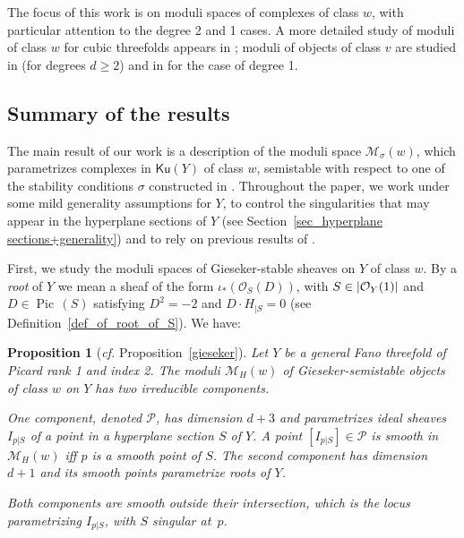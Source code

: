 \documentclass[11pt]{amsart}
\newtheorem{proposition}[thm]{Proposition}
\theoremstyle{definition}
\DeclareMathOperator{\Pic}{Pic\,}
\newcommand{\sO}{\mathcal{O}}
\newcommand{\sM}{\mathcal{M}}
\DeclarePairedDelimiter{\abs}{\lvert}{\rvert}
\newcommand{\Ku}{\mathsf{Ku}}
\begin{document}
The focus of this work is on moduli spaces of complexes of class $w$, with particular attention to the degree 2 and 1 cases.
A more detailed study of moduli of class $w$ for cubic threefolds appears in \cite{Bayer}; moduli of objects of class $v$ are studied in \cite{PY20} (for degrees $d\geq 2$) and in \cite{PR20_veronese} for the case of degree 1.

\subsection*{Summary of the results}

The main result of our work is a description of the moduli space $\sM_\sigma(w)$, which parametrizes complexes in $\Ku(Y)$ of class $w$, semistable with respect to one of the stability conditions $\sigma$ constructed in \cite{BLMS17}. Throughout the paper, we work under some mild generality assumptions for $Y$, to control the singularities that may appear in the hyperplane sections of $Y$ (see Section~\ref{sec_hyperplane sections+generality}) and to rely on previous results of \cite{Wel81,Tih82}.


First, we study the moduli spaces of Gieseker-stable sheaves on $Y$ of class $w$. By a \emph{root} of $Y$ we mean a sheaf of the form  $\iota_*(\sO_S(D))$, with $S\in \abs{\sO_Y(1)}$ and $D\in \Pic(S)$ satisfying $D^2=-2$ and $D\cdot H_{|S}=0$ (see Definition~\ref{def_of_root_of_S}). We have:

\begin{proposition}[\emph{cf.} Proposition~\ref{gieseker}]
Let $Y$ be a general Fano threefold of Picard rank 1 and index 2. The moduli $\sM_H(w)$ of Gieseker-semistable objects of class $w$ on $Y$ has two irreducible components. 

One component, denoted $\mathcal{P}$, has dimension $d+3$ and parametrizes ideal sheaves  $I_{p|S}$ of a point in a hyperplane section $S$ of $Y$. A point $[I_{p|S}]\in \mathcal P$ is smooth in $\sM_H(w)$ iff $p$ is a smooth point of $S$.
The second component has dimension $d+1$ and its smooth points parametrize roots of $Y$.%

Both components are smooth outside their intersection, which is the locus parametrizing $I_{p|S}$, with $S$ singular at~$p$.
\end{proposition}
\end{document}
